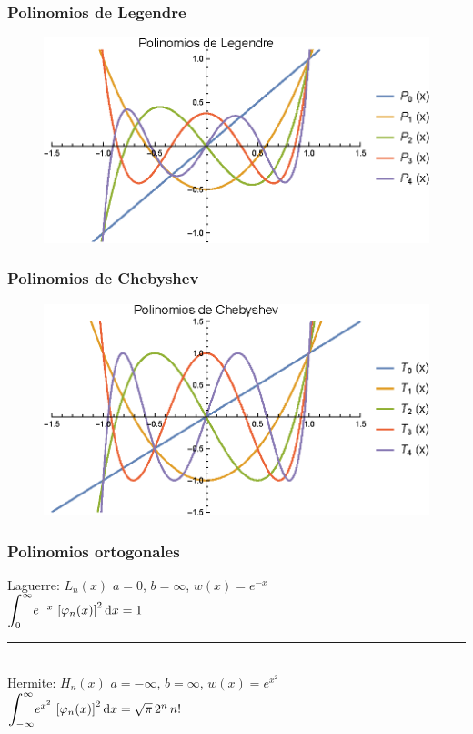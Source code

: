 \documentclass[12pt]{beamer}
\begin{document}
\begin{frame}
\frametitle{Polinomios de Legendre}
\begin{figure}
  \centering
  \includegraphics[scale=0.9]{Imagenes/plot_Legendre_01.eps}
\end{figure}
\end{frame}
\begin{frame}
\frametitle{Polinomios de Chebyshev}
\begin{figure}
  \centering
  \includegraphics[scale=0.9]{Imagenes/plot_Chebyshev_01.eps}
\end{figure}
\end{frame}
\begin{frame}
\frametitle{Polinomios ortogonales}
Laguerre: $L_{n} (x)$ \hspace{0.5cm} $a = 0$, $b = \infty$, $w (x) = e^{-x}$ \\[0.5em]
$\scaleint{6ex}_{\bs 0}^{\infty} e^{-x} \, \left[ \varphi_{n} (x)\right]^{2} \dd{x} = 1$ 
\\[0.5em]
\rule{10cm}{1pt}
\\[0.5em]
Hermite: $H_{n} (x)$ \hspace{0.5cm} $a = -\infty$, $b = \infty$, $w (x) = e^{x^{2}}$ \\
$\scaleint{6ex}_{\bs -\infty}^{\infty} e^{x^{2}} \, \left[ \varphi_{n} (x) \right]^{2} \dd{x} = \sqrt{\pi} \, 2^{n} \, n!$
\end{frame}
\end{document}
